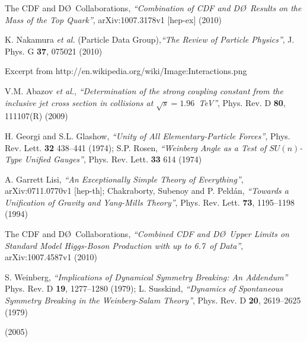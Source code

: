 \begin{thebibliography}{1}
%

 The CDF and D\O~Collaborations, \textit{``Combination of CDF and D\O~Results on the Mass of the Top Quark''}, arXiv:1007.3178v1 [hep-ex] (2010)

 K. Nakamura \textit{et al.} (Particle Data Group),\textit{``The Review of Particle Physics''}, J. Phys. G \textbf{37}, 075021 (2010)

 Excerpt from http://en.wikipedia.org/wiki/Image:Interactions.png

 V.M. Abazov {\it et al.}, \textit{``Determination of the strong coupling constant from the inclusive jet cross section in \ppbar collisions at $\sqrt{s}=1.96$~TeV''}, Phys. Rev. D \textbf{80}, 111107(R) (2009)

 H. Georgi and S.L. Glashow, \textit{``Unity of All Elementary-Particle Forces''}, Phys. Rev. Lett. {\bf 32} 438--441 (1974); S.P. Rosen, \textit{``Weinberg Angle as a Test of $SU(n)$-Type Unified Gauges''}, Phys. Rev. Lett. {\bf 33} 614 (1974)

 A. Garrett Lisi, \textit{``An Exceptionally Simple Theory of Everything''}, arXiv:0711.0770v1 [hep-th]; Chakraborty, Subenoy and P. Peld\'an, \textit{``Towards a Unification of Gravity and Yang-Mills Theory''}, Phys. Rev. Lett. {\bf 73}, 1195--1198 (1994)


 The CDF and D\O~Collaborations, \textit{``Combined CDF and D\O~Upper Limits on Standard Model Higgs-Boson Production with up to 6.7~\fbi of Data''}, arXiv:1007.4587v1 (2010)

 S. Weinberg, \textit{``Implications of Dynamical Symmetry Breaking: An Addendum''} Phys. Rev. D {\bf 19}, 1277--1280 (1979); L. Susskind, \textit{``Dynamics of Spontaneous Symmetry Breaking in the Weinberg-Salam Theory''}, Phys. Rev. D {\bf 20}, 2619--2625 (1979)


 (2005)


\end{thebibliography}
